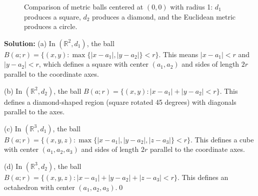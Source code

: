 \begin{figure}[h]
\centering
{}
\caption{Comparison of metric balls centered at $(0,0)$ with radius 1: $d_1$ produces a square, $d_2$ produces a diamond, and the Euclidean metric produces a circle.}
\end{figure}

\bigskip\noindent\textbf{Solution:} 
(a) In $(\mathbb{R}^2, d_1)$, the ball $B(a;r) = \{(x,y) : \max\{|x-a_1|, |y-a_2|\} < r\}$. This means $|x-a_1| < r$ and $|y-a_2| < r$, which defines a square with center $(a_1,a_2)$ and sides of length $2r$ parallel to the coordinate axes.

(b) In $(\mathbb{R}^2, d_2)$, the ball $B(a;r) = \{(x,y) : |x-a_1| + |y-a_2| < r\}$. This defines a diamond-shaped region (square rotated 45 degrees) with diagonals parallel to the axes.

(c) In $(\mathbb{R}^3, d_1)$, the ball $B(a;r) = \{(x,y,z) : \max\{|x-a_1|, |y-a_2|, |z-a_3|\} < r\}$. This defines a cube with center $(a_1,a_2,a_3)$ and sides of length $2r$ parallel to the coordinate axes.

(d) In $(\mathbb{R}^3, d_2)$, the ball $B(a;r) = \{(x,y,z) : |x-a_1| + |y-a_2| + |z-a_3| < r\}$. This defines an octahedron with center $(a_1,a_2,a_3)$.\qed


